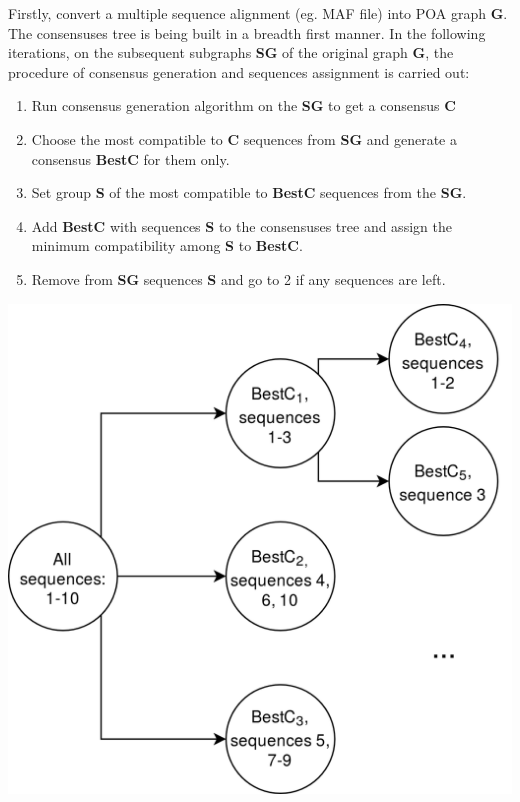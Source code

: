 \documentclass[a0paper,portrait]{baposter}
\begin{document}
\begin{poster}
{Firstly, convert a multiple sequence alignment (eg. MAF file) into POA graph \textbf{G}. The consensuses tree is being built in a breadth first manner. In the following iterations, on the subsequent subgraphs \textbf{SG} of the original graph \textbf{G}, the procedure of consensus generation and sequences assignment is carried out:
\begin{center}
\begin{minipage}{0.49\linewidth}
\begin{enumerate}
\setlength\itemsep{0em}
\item Run consensus generation algorithm on the \textbf{SG} to get a consensus \textbf{C}
\item Choose the most compatible to \textbf{C} sequences from \textbf{SG} and generate a consensus \textbf{BestC} for them only.
\item Set group \textbf{S} of the most compatible to \textbf{BestC} sequences from the \textbf{SG}.
\item Add \textbf{BestC} with sequences \textbf{S} to the consensuses tree and assign the minimum compatibility among \textbf{S} to \textbf{BestC}.
\item Remove from \textbf{SG} sequences \textbf{S} and go to 2 if any sequences are left.
\end{enumerate}
\end{minipage}
\begin{minipage}{0.49\linewidth}
\begin{center}
\includegraphics[scale=0.13]{consensuses_tree}
\end{center}
\end{minipage}
\end{center}

}
\end{poster}
\end{document}
